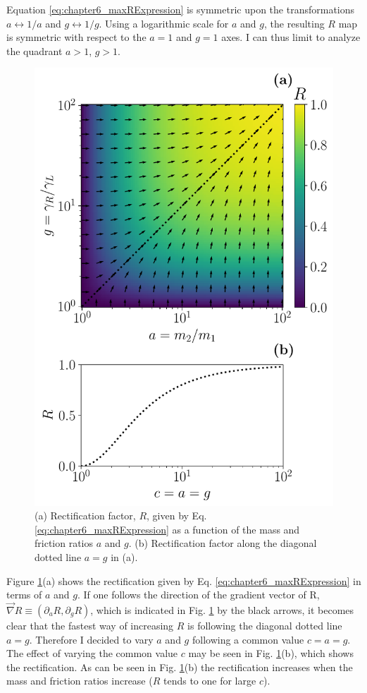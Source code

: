 Equation \eqref{eq:chapter6_maxRExpression} is symmetric upon the transformations $a \leftrightarrow 1/a$ and $g \leftrightarrow 1/g$. Using a logarithmic scale for $a$ and $g$, the resulting $R$ map is symmetric with respect to the $a=1$ and $g=1$ axes. I can thus limit to analyze the quadrant $a > 1$, $g > 1$.


\begin{figure}
  \center
  \includegraphics[width=0.75\linewidth]{Figures/MaximalR.pdf}
  \caption{(a) Rectification factor, $R$, given by Eq. \eqref{eq:chapter6_maxRExpression} as a function of the mass and friction ratios $a$ and $g$. (b) Rectification factor along the diagonal dotted line $a=g$ in (a).}
  \label{fig:maximalR}
\end{figure}

Figure \ref{fig:maximalR}(a) shows the rectification given by Eq. \eqref{eq:chapter6_maxRExpression} in terms of $a$ and $g$. If one follows the direction of the gradient vector of R, $\overrightarrow{\nabla}R\equiv\left( \partial_a R, \partial_g R \right)$, which is indicated in Fig. \ref{fig:maximalR} by the black arrows, it becomes clear that the fastest way of increasing $R$ is following the diagonal dotted line $a=g$. Therefore I decided to vary $a$ and $g$ following a common value $c=a = g$. The effect of varying  the common value $c$ may be seen in Fig. \ref{fig:maximalR}(b), which  shows the rectification. As can be seen in Fig. \ref{fig:maximalR}(b) the rectification increases when the mass and friction ratios increase ($R$ tends to one for large $c$).
%
%
